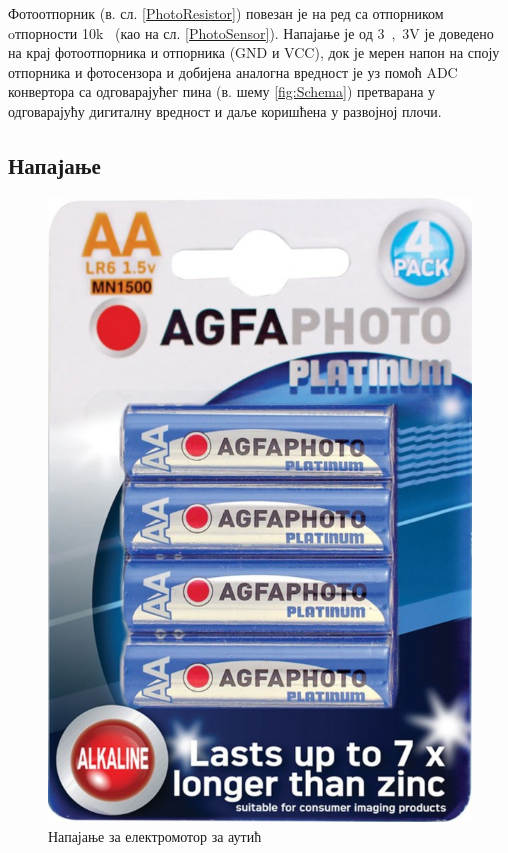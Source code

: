 	Фотоотпорник (в. сл. \ref{PhotoResistor}) повезан је на ред са отпорником oтпорности \si{10k\Omega} (као на сл. \ref{PhotoSensor}). Напајање је од \si{3,3V} је доведено на крај фотоотпорника и отпорника (GND и VCC), док је мерен напон на споју отпорника и фотосензора и добијена аналогна вредност је уз помоћ ADC конвертора са одговарајућег пина (в. шему \ref{fig:Schema}) претварана у одговарајућу дигиталну вредност и даље коришћена у развојној плочи.
	
\subsection{Напајање}
	\begin{figure}[htb!]
		\begin{center}
			\includegraphics[scale=0.25]{pictures/AGFABattery}
			\caption{Напајање за електромотор за аутић} \label{fig:AGFA}
		\end{center}
	\end{figure}
